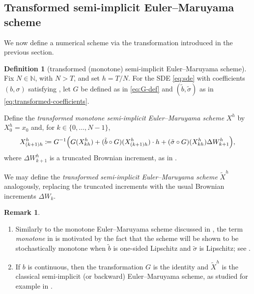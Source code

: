 \documentclass[onseside, final]{amsart}
\theoremstyle{definition}
\newtheorem{definition}[theorem]{Definition}
\newtheorem{remark}[theorem]{Remark}
\newcommand{\N}{\mathbb N}
\numberwithin{equation}{section}
\begin{document}
	\subsection{Transformed semi-implicit Euler--Maruyama scheme}\label{sec:implicit-transformed-em}
		We now define a numerical scheme via the transformation introduced in the previous section.
		
		\begin{definition}[transformed (monotone) semi-implicit Euler--Maruyama scheme]\label{def:mono-si-em}
			Fix $N \in \N$, with $N > T$, and set $h = T / N$. For the SDE \eqref{eq:sde} with coefficients $(b, \sigma)$ satisfying , let $G$ be defined as in \eqref{eq:G-def} and $(\tilde b, \tilde \sigma)$ as in \eqref{eq:transformed-coefficients}.
		  
			Define the \emph{transformed monotone semi-implicit Euler--Maruyama scheme} $X^h$ by $X^h_0 = x_0$ and, for $k \in \{0, \dotsc, N - 1\}$,
			\begin{equation}\label{eq:implicit-scheme}
				 X^h_{(k + 1)h} \coloneqq G^{-1}\Bigl(G(X^h_{kh}) + (\tilde b \circ G)(X^h_{(k+1)h}) \cdot h + (\tilde \sigma \circ G)(X^h_{kh})\Delta W^h_{k + 1}\Bigr),
			\end{equation}
			where $\Delta W^h_{k + 1}$ is a truncated Brownian increment, as in .
			
			We may define the \emph{transformed semi-implicit Euler--Maruyama scheme} $\tilde X^h$ analogously, replacing the truncated increments with the usual Brownian increments $\Delta W_{k}$.
		\end{definition}
		
		\begin{remark}\label{rem:terminology-monotone-implicit}~
			\begin{enumerate}[label=(\roman*)]
				\item Similarly to the monotone Euler--Maruyama scheme discussed in , the term \emph{monotone} in  is motivated by the fact that the scheme will be shown to be stochastically monotone when $\tilde b$ is one-sided Lipschitz and $\tilde \sigma$ is Lipschitz; see .
				\item If $b$ is continuous, then the transformation $G$ is the identity and $\tilde X^h$ is the classical semi-implicit (or backward) Euler--Maruyama scheme, as studied for example in \cite{Hu96,HiMaSt02,MaSz13a,MaSz13b}.
			\end{enumerate}
		\end{remark}
		
\end{document}

